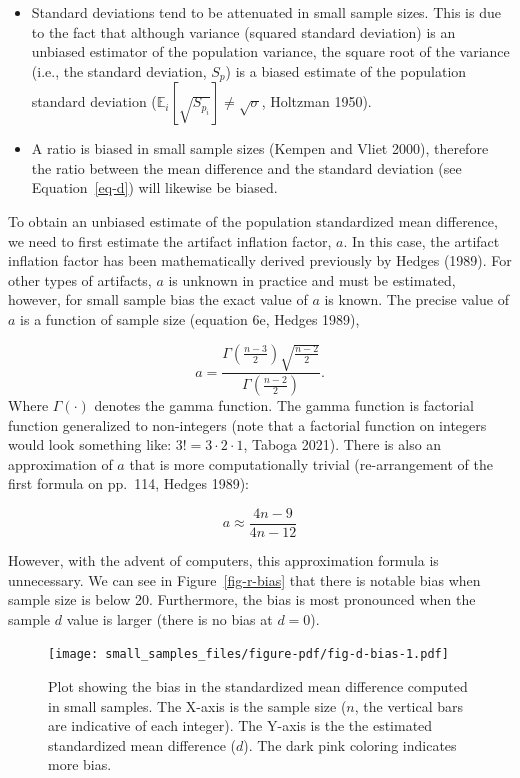 \documentclass[
  letterpaper,
  DIV=11,
  numbers=noendperiod]{scrreprt}
\providecommand{\tightlist}{%
  \setlength{\itemsep}{0pt}\setlength{\parskip}{0pt}}\usepackage{longtable,booktabs,array}
\begin{document}
\begin{itemize}
\tightlist
\item
  Standard deviations tend to be attenuated in small sample sizes. This
  is due to the fact that although variance (squared standard deviation)
  is an unbiased estimator of the population variance, the square root
  of the variance (i.e., the standard deviation, \(S_p\)) is a biased
  estimate of the population standard deviation
  (\(\mathbb{E}_i[\sqrt{S_{p_i}}] \neq \sqrt{\sigma}\), Holtzman 1950).
\item
  A ratio is biased in small sample sizes (Kempen and Vliet 2000),
  therefore the ratio between the mean difference and the standard
  deviation (see Equation~\ref{eq-d}) will likewise be biased.
\end{itemize}

To obtain an unbiased estimate of the population standardized mean
difference, we need to first estimate the artifact inflation factor,
\(a\). In this case, the artifact inflation factor has been
mathematically derived previously by Hedges (1989). For other types of
artifacts, \(a\) is unknown in practice and must be estimated, however,
for small sample bias the exact value of \(a\) is known. The precise
value of \(a\) is a function of sample size (equation 6e, Hedges 1989),

\[
a = \frac{\Gamma\left(\frac{n-3}{2}\right)\sqrt{\frac{n-2}{2}}}{\Gamma\left(\frac{n-2}{2}\right)}.
\] Where \(\Gamma(\cdot)\) denotes the gamma function. The gamma
function is factorial function generalized to non-integers (note that a
factorial function on integers would look something like:
\(3! = 3 \cdot 2 \cdot 1\), Taboga 2021). There is also an approximation
of \(a\) that is more computationally trivial (re-arrangement of the
first formula on pp.~114, Hedges 1989):

\[
a \approx \frac{4n-9}{4n-12}
\]

However, with the advent of computers, this approximation formula is
unnecessary. We can see in Figure~\ref{fig-r-bias} that there is notable
bias when sample size is below 20. Furthermore, the bias is most
pronounced when the sample \(d\) value is larger (there is no bias at
\(d=0\)).

\begin{figure}[H]

{\centering \texttt{[image: small\_samples\_files/figure-pdf/fig-d-bias-1.pdf]}

}

\caption{\label{fig-d-bias}Plot showing the bias in the standardized
mean difference computed in small samples. The X-axis is the sample size
(\(n\), the vertical bars are indicative of each integer). The Y-axis is
the the estimated standardized mean difference (\(d\)). The dark pink
coloring indicates more bias.}

\end{figure}
\end{document}
